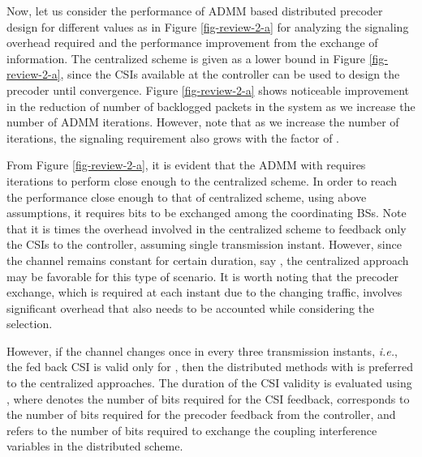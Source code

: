 \begin{enumerate}
\begin{itemize}
Now, let us consider the performance of \ac{ADMM} based distributed precoder design for different  values as in Figure \ref{fig-review-2-a} for analyzing the signaling overhead required and the performance improvement from the exchange of information. The centralized scheme is given as a lower bound in Figure \ref{fig-review-2-a}, since the \acp{CSI} available at the controller can be used to design the precoder until convergence. Figure \ref{fig-review-2-a} shows noticeable improvement in the reduction of number of backlogged packets in the system as we increase the number of \ac{ADMM} iterations. However, note that as we increase the number of iterations, the signaling requirement also grows with the factor of . 

From Figure \ref{fig-review-2-a}, it is evident that the \ac{ADMM} with  requires  iterations to perform close enough to the centralized scheme. In order to reach the performance close enough to that of centralized scheme, using above assumptions, it requires  bits to be exchanged among the coordinating \acp{BS}. Note that it is  times the overhead involved in the centralized scheme to feedback only the \acp{CSI} to the controller, assuming single transmission instant. However, since the channel remains constant for certain duration, say , the centralized approach may be favorable for this type of scenario. It is worth noting that the precoder exchange, which is required at each instant due to the changing traffic, involves significant overhead that also needs to be accounted while considering the selection.

However, if the channel changes once in every three transmission instants, \textit{i.e.}, the fed back \ac{CSI} is valid only for , then the distributed methods with  is preferred to the centralized approaches. The duration of the \ac{CSI} validity is evaluated using , where  denotes the number of bits required for the \ac{CSI} feedback,  corresponds to the number of bits required for the precoder feedback from the controller, and  refers to the number of bits required to exchange the coupling interference variables in the distributed scheme. 


\end{itemize}
\end{enumerate}
